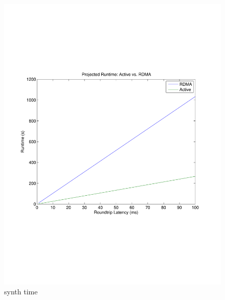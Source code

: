 \documentclass[10pt]{article}
\begin{document}
\begin{figure}
  \centering
\includegraphics[scale=0.5, trim = 0 200 0 200]{../../results/matlab/synth_time.pdf}
  \caption{synth time}\label{synth_time}
\end{figure}
\end{document}

